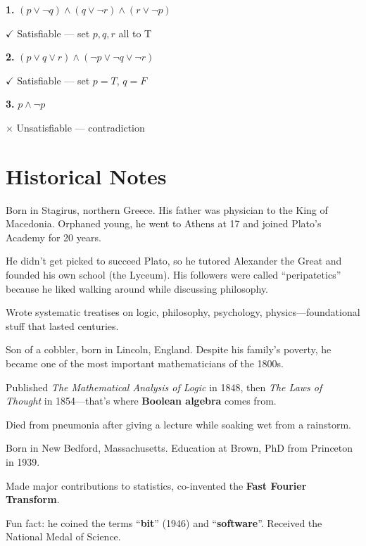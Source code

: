 \documentclass[11pt,a4paper]{article}
\begin{document}
\begin{examplebox}
\textbf{1.} $(p \lor \neg q) \land (q \lor \neg r) \land (r \lor \neg p)$

$\checkmark$ Satisfiable --- set $p, q, r$ all to T

\textbf{2.} $(p \lor q \lor r) \land (\neg p \lor \neg q \lor \neg r)$

$\checkmark$ Satisfiable --- set $p = T$, $q = F$

\textbf{3.} $p \land \neg p$

$\times$ Unsatisfiable --- contradiction
\end{examplebox}

\newpage

\section{Historical Notes}

\begin{tipbox}
Born in Stagirus, northern Greece. His father was physician to the King of Macedonia. Orphaned young, he went to Athens at 17 and joined Plato's Academy for 20 years.

He didn't get picked to succeed Plato, so he tutored Alexander the Great and founded his own school (the Lyceum). His followers were called ``peripatetics'' because he liked walking around while discussing philosophy.

Wrote systematic treatises on logic, philosophy, psychology, physics---foundational stuff that lasted centuries.
\end{tipbox}

\begin{tipbox}
Son of a cobbler, born in Lincoln, England. Despite his family's poverty, he became one of the most important mathematicians of the 1800s.

Published \textit{The Mathematical Analysis of Logic} in 1848, then \textit{The Laws of Thought} in 1854---that's where \textbf{Boolean algebra} comes from.

Died from pneumonia after giving a lecture while soaking wet from a rainstorm.
\end{tipbox}

\begin{tipbox}
Born in New Bedford, Massachusetts. Education at Brown, PhD from Princeton in 1939.

Made major contributions to statistics, co-invented the \textbf{Fast Fourier Transform}.

Fun fact: he coined the terms ``\textbf{bit}'' (1946) and ``\textbf{software}''. Received the National Medal of Science.
\end{tipbox}
\end{document}
